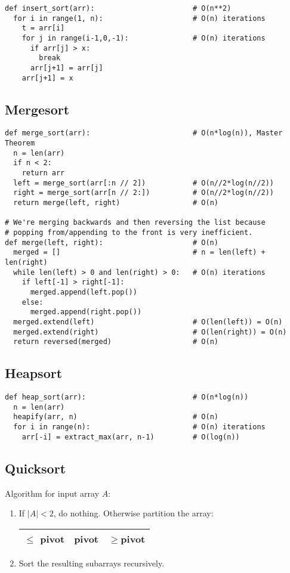 \documentclass{article}
\begin{document}
\begin{verbatim}
def insert_sort(arr):                       # O(n**2)
  for i in range(1, n):                     # O(n) iterations
    t = arr[i]
    for j in range(i-1,0,-1):               # O(n) iterations
      if arr[j] > x:
        break
      arr[j+1] = arr[j]
    arr[j+1] = x
\end{verbatim}

\subsection{Mergesort}

\begin{verbatim}
def merge_sort(arr):                        # O(n*log(n)), Master Theorem
  n = len(arr)
  if n < 2:
	return arr
  left = merge_sort(arr[:n // 2])           # O(n//2*log(n//2))
  right = merge_sort(arr[n // 2:])          # O(n//2*log(n//2))
  return merge(left, right)                 # O(n)

# We're merging backwards and then reversing the list because
# popping from/appending to the front is very inefficient.
def merge(left, right):                     # O(n)
  merged = []                               # n = len(left) + len(right)
  while len(left) > 0 and len(right) > 0:   # O(n) iterations
    if left[-1] > right[-1]:
      merged.append(left.pop())
    else:
      merged.append(right.pop())
  merged.extend(left)                       # O(len(left)) = O(n)
  merged.extend(right)                      # O(len(right)) = O(n)
  return reversed(merged)                   # O(n)
\end{verbatim}

\subsection{Heapsort}

\begin{verbatim}
def heap_sort(arr):                         # O(n*log(n))
  n = len(arr)
  heapify(arr, n)                           # O(n)
  for i in range(n):                        # O(n) iterations
    arr[-i] = extract_max(arr, n-1)         # O(log(n))
\end{verbatim}

\subsection{Quicksort}

Algorithm for input array $A$:
\begin{enumerate}
	\item If $|A|<2$, do nothing. Otherwise partition the array:
	\begin{tabular}{|c|c|c|}
		\hline
		$\leq$ pivot & pivot & $\geq$pivot\\
		\hline
	\end{tabular}
	\item Sort the resulting subarrays recursively.
\end{enumerate}
\end{document}
